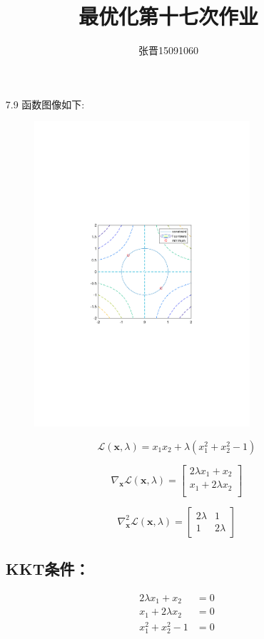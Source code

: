 \documentclass[UTF8]{ctexart}
\title{\heiti 最优化第十七次作业}
\author{\kaishu 张晋15091060}
\begin{document}
\maketitle

\begin{enumerate}
\item[7.9]
函数图像如下:
\begin{figure}[H]
\centering
\includegraphics[width=8cm]{1.pdf}
\end{figure}

\[\mathcal{L}(\bm{x},\lambda)=x_1x_2+\lambda(x_1^2+x_2^2-1)\]

\[\nabla_{\bm{x}}\mathcal{L}(\bm{x},\lambda)=\begin{bmatrix}
2\lambda x_1+x_2\\
x_1+2\lambda x_2\\
\end{bmatrix}\]

\[\nabla_{\bm{x}}^2\mathcal{L}(\bm{x},\lambda)=\begin{bmatrix}
2\lambda &1\\
1&2\lambda
\end{bmatrix}\]

\subsection*{KKT条件：}
\begin{align}
2\lambda x_1+x_2&=0\\
x_1+2\lambda x_2&=0\\
x_1^2+x_2^2-1&=0
\end{align}


\end{enumerate}
\end{document}
